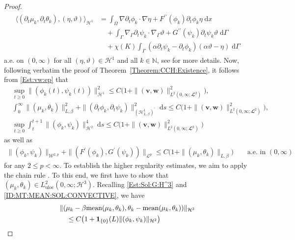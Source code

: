 \documentclass[10pt,reqno]{amsart}
\theoremstyle{remark}
\numberwithin{equation}{section}
\newcommand{\norm}[1]{\| #1 \|}
\newcommand{\scp}[2]{ ( #1 , #2  )}
\newcommand{\mean}[2]{\textnormal{mean}\scp{#1}{#2}}
\newcommand{\N}{\mathbb N}
\newcommand{\bv}{\mathbf{v}}
\newcommand{\bw}{\mathbf{w}}
\newcommand{\intO}{\int_\Omega}
\newcommand{\intG}{\int_\Gamma}
\newcommand{\dx}{\;\mathrm{d}x}
\newcommand{\ds}{\;\mathrm ds}
\newcommand{\dG}{\;\mathrm d\Ga}
\newcommand{\delt}{\partial_{t}}
\newcommand{\Grad}{\nabla}
\newcommand{\Gradg}{\nabla_\Ga}
\newcommand{\Ga}{\Gamma}
\begin{document}
\begin{proof}
\begin{align}
    \begin{split}
        \big\langle (\delt\mu_k,\delt\theta_k), (\eta,\vartheta)\big\rangle_{\mathcal{H}^1} &= \intO \Grad\delt\phi_k\cdot\Grad\eta + F^{\prime\prime}(\phi_k)\delt\phi_k\eta\dx \\
        &\quad + \intG \Gradg\delt\psi_k\cdot\Gradg\vartheta + G^{\prime\prime}(\psi_k)\delt\psi_k\vartheta\dG \\
        &\quad + \chi(K)\intG(\alpha\delt\psi_k - \delt\phi_k)(\alpha\vartheta - \eta)\dG
    \end{split}
\end{align}
a.e. on $(0,\infty)$ for all $(\eta,\vartheta)\in\mathcal{H}^1$ and all $k\in\N$, see \cite[Proof of Theorem~3.6, Step~5.1]{Giorgini2025} for more details. Now, following verbatim the proof of Theorem~\ref{Theorem:CCH:Existence}, it follows from \eqref{Est:vw:ep} that
\begin{align}
    &\sup_{t\geq 0}\norm{(\phi_k(t),\psi_k(t))}_{\mathcal{H}^1}^2 \leq C\big(1 + \norm{(\bv,\bw)}_{L^2(0,\infty;\mathbfcal{L}^2)}^2\big), \label{Est:HighReg:pp:k}\\
    &\int_0^\infty \norm{(\mu_k,\theta_k)}_{L,\beta}^2 + \norm{(\delt\phi_k,\delt\psi_k)}_{(\mathcal{H}^1_{L,\beta})^\prime}^2 \ds \leq C\big(1 + \norm{(\bv,\bw)}_{L^2(0,\infty;\mathbfcal{L}^2)}^2\big), \label{Est:HighReg:mt:delt:pp:k}\\
    &\sup_{t\geq 0}\int_t^{t+1}\norm{(\phi_k,\psi_k)}_{\mathcal{H}^2}^4\ds \leq C\big(1 + \norm{(\bv,\bw)}_{L^2(0,\infty;\mathbfcal{L}^2)}^2\big) \label{Est:HighReg:pp:H^2:k}
\end{align}
as well as
\begin{align}\label{Est:HighReg:pp:pot:k}
    \norm{(\phi_k,\psi_k)}_{\mathcal{W}^{2,p}} + \norm{(F^\prime(\phi_k),G^\prime(\psi_k))}_{\mathcal{L}^p} \leq C\big(1 + \norm{(\mu_k,\theta_k)}_{L,\beta}) \qquad\text{a.e.~in~}(0,\infty)
\end{align}
for any $2 \leq p < \infty$. To establish the higher regularity estimates, we aim to apply the chain rule \cite[Proposition~A.1]{Stange2025}. To this end, we first have to show that $(\mu_k,\theta_k) \in L^2_{\mathrm{uloc}}(0,\infty;\mathcal{H}^3)$. Recalling \eqref{Est:Sol:G:H^3} and \eqref{ID:MT:MEAN:SOL:CONVECTIVE}, we have
\begin{align}\label{Est:MT:H^3:mean:Conv}
    &\norm{(\mu_k - \beta\mean{\mu_k}{\theta_k},\theta_k - \mean{\mu_k}{\theta_k})}_{\mathcal{H}^3} \nonumber \\
    &\quad\leq C\big(1 + \mathbf{1}_{\{0\}}(L)\norm{(\phi_k,\psi_k)}_{\mathcal{H}^2}\big) \nonumber \\

\end{align}
\end{proof}
\end{document}
